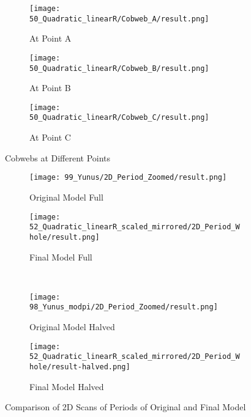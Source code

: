 \begin{figure}
	\centering
	\begin{subfigure}{0.3\textwidth}
		\centering
		\texttt{[image: 50\_Quadratic\_linearR/Cobweb\_A/result.png]}
		\caption{At Point A}
		\label{fig:quad.full.fit.lin.CobwebA}
	\end{subfigure}
	\begin{subfigure}{0.3\textwidth}
		\centering
		\texttt{[image: 50\_Quadratic\_linearR/Cobweb\_B/result.png]}
		\caption{At Point B}
		\label{fig:quad.full.fit.lin.CobwebB}
	\end{subfigure}
	\begin{subfigure}{0.3\textwidth}
		\centering
		\texttt{[image: 50\_Quadratic\_linearR/Cobweb\_C/result.png]}
		\caption{At Point C}
		\label{fig:quad.full.fit.lin.CobwebC}
	\end{subfigure}
	\caption{Cobwebs at Different Points}
	\label{fig:quad.full.fit.lin.Cobwebs}
\end{figure}

\begin{figure}
	\centering
	\begin{subfigure}{0.4\textwidth}
		\centering
		\texttt{[image: 99\_Yunus/2D\_Period\_Zoomed/result.png]}
		\caption{Original Model Full}
		\label{fig:quad.final.comparison.og.full}
	\end{subfigure}
	\begin{subfigure}{0.4\textwidth}
		\centering
		\texttt{[image: 52\_Quadratic\_linearR\_scaled\_mirrored/2D\_Period\_Whole/result.png]}
		\caption{Final Model Full}
		\label{fig:quad.final.comparison.fin.full}
	\end{subfigure} \\
	\begin{subfigure}{0.4\textwidth}
		\centering
		\texttt{[image: 98\_Yunus\_modpi/2D\_Period\_Zoomed/result.png]}
		\caption{Original Model Halved}
		\label{fig:quad.final.comparison.og.halved}
	\end{subfigure}
	\begin{subfigure}{0.4\textwidth}
		\centering
		\texttt{[image: 52\_Quadratic\_linearR\_scaled\_mirrored/2D\_Period\_Whole/result-halved.png]}
		\caption{Final Model Halved}
		\label{fig:quad.final.comparison.fin.halved}
	\end{subfigure}
	\caption{Comparison of 2D Scans of Periods of Original and Final Model}
	\label{fig:quad.final.comparison}
\end{figure}
